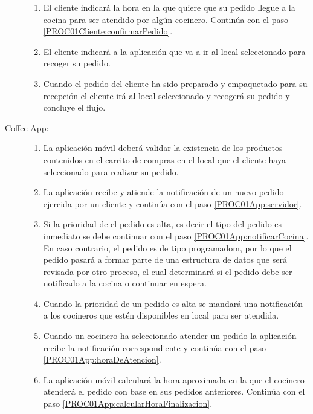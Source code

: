\begin{description}
\begin{enumerate}
			\item \label{PROC01Cliente:indicarHora} \task El cliente indicará la hora en la que quiere que su pedido llegue a la cocina para ser atendido por algún cocinero. Continúa con el paso \ref{PROC01Cliente:confirmarPedido}.
			\item \label{PROC01Cliente:confirmarPedido} \task El cliente indicará a la aplicación que va a ir al local seleccionado para recoger su pedido. 
			\item \label{PROC01Cliente:notif} Cuando el pedido del cliente ha sido preparado y empaquetado para su recepción el cliente irá al local seleccionado y recogerá su pedido y concluye el flujo.
		\end{enumerate}
	
	\item[Coffee App:]\hspace{1pt}
		\begin{enumerate}
			\item \label{PROC01App:ValidarExistencia}\task La aplicación móvil deberá validar la existencia de los productos contenidos en el carrito de compras en el local que el cliente haya seleccionado para realizar su pedido.
			\item \label{PROC01App:notif} La aplicación recibe y atiende la notificación de un nuevo pedido ejercida por un cliente y continúa con el paso \ref{PROC01App:servidor}.	
			\item \label{PROC01App:servidor} \task Si la prioridad de el pedido es alta, es decir el tipo del pedido es inmediato se debe continuar con el paso \ref{PROC01App:notificarCocina}. En caso contrario, el pedido es de tipo programadom, por lo que el pedido pasará a formar parte de una estructura de datos que será revisada por otro proceso, el cual determinará si el pedido debe ser notificado a la cocina o continuar en espera.
			\item \label{PROC01App:notificarCocina} \task Cuando la prioridad de un pedido es alta se mandará una notificación a los cocineros que estén disponibles en local para ser atendida.
			\item \label{PROC01App:atencionPedido} Cuando un cocinero ha seleccionado atender un pedido la aplicación recibe la notificación correspondiente y continúa con el paso \ref{PROC01App:horaDeAtencion}.
			\item \label{PROC01App:horaDeAtencion} \task La aplicación móvil calculará la hora aproximada en la que el cocinero atenderá el pedido con base en sus pedidos anteriores. Continúa con el paso \ref{PROC01App:calcularHoraFinalizacion}.

\end{enumerate}
\end{description}
